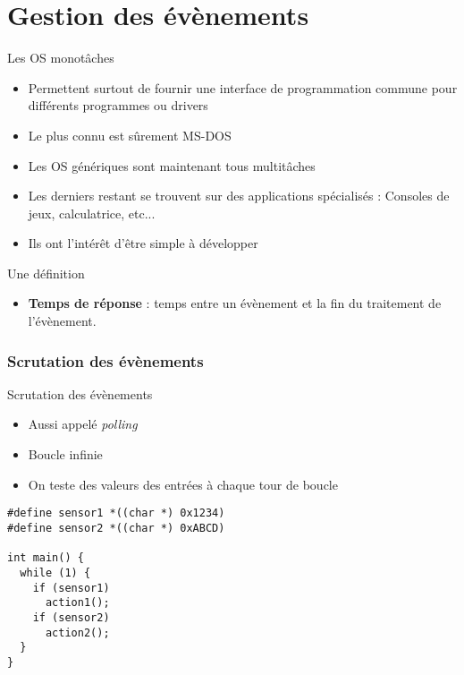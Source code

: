 %
%
%

\part{Gestion des évènements}

\begin{frame}
  \partpage
\end{frame}

\begin{frame}
  \tableofcontents
\end{frame}

\begin{frame}{Les OS monotâches}
  \begin{itemize}
  \item Permettent  surtout de fournir une  interface de programmation
    commune pour différents programmes ou drivers
  \item Le plus connu est sûrement MS-DOS
  \item Les OS génériques sont maintenant tous multitâches
  \item  Les  derniers  restant   se  trouvent  sur  des  applications
    spécialisés : Consoles de jeux, calculatrice, etc...
  \item Ils ont l'intérêt d'être simple à développer
  \end{itemize}
\end{frame}

\begin{frame}{Une définition}
  \begin{itemize}
  \item \textbf{Temps de réponse} : temps entre un évènement et la fin
    du traitement de l'évènement.
  \end{itemize}
\end{frame}

\section{Scrutation des évènements}
\begin{frame}[fragile]{Scrutation des évènements}
  \begin{itemize}
  \item Aussi appelé \emph{polling}
  \item Boucle infinie
  \item On teste des valeurs des entrées à chaque tour de boucle
  \end{itemize}
  \begin{lstlisting}
#define sensor1 *((char *) 0x1234)
#define sensor2 *((char *) 0xABCD)

int main() {
  while (1) {
    if (sensor1)
      action1();
    if (sensor2)
      action2();
  }
}
  \end{lstlisting}
\end{frame}

